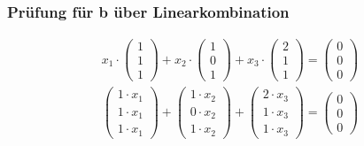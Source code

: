 \subsubsection{Prüfung für b über Linearkombination}
\begin{align*}
    x_1 \cdot \begin{pmatrix}
                  1 \\ 1 \\ 1
              \end{pmatrix} + x_2 \cdot \begin{pmatrix}
                                            1 \\ 0 \\ 1
                                        \end{pmatrix} + x_3 \cdot \begin{pmatrix}
                                                                      2 \\ 1 \\ 1
                                                                  \end{pmatrix} = \begin{pmatrix}
                                                                                      0 \\ 0 \\ 0
                                                                                  \end{pmatrix}                                                                                \\
    \begin{pmatrix}
        1 \cdot x_1 \\ 1 \cdot x_1 \\ 1 \cdot x_1
    \end{pmatrix} + \begin{pmatrix}
                        1 \cdot x_2 \\ 0 \cdot x_2 \\ 1 \cdot x_2
                    \end{pmatrix} + \begin{pmatrix}
                                        2 \cdot x_3 \\ 1 \cdot x_3 \\ 1 \cdot x_3
                                    \end{pmatrix} = \begin{pmatrix}
                                                        0 \\ 0 \\ 0

\end{pmatrix}
\end{align*}
